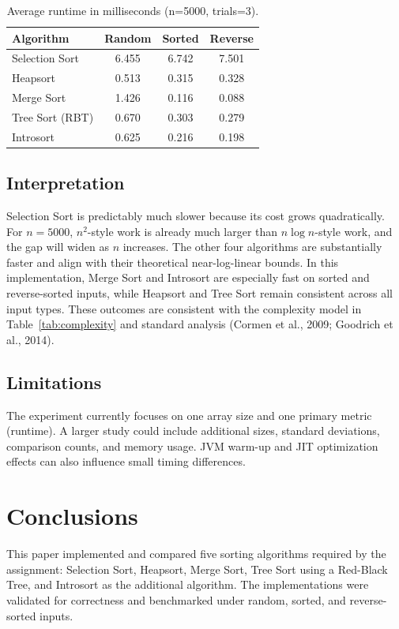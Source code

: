 \documentclass[12pt]{article}
\begin{document}
\begin{table}[H]
\centering
\caption{Average runtime in milliseconds (n=5000, trials=3).}
\label{tab:results}
\begin{tabular}{lccc}
\toprule
Algorithm & Random & Sorted & Reverse \\
\midrule
Selection Sort & 6.455 & 6.742 & 7.501 \\
Heapsort & 0.513 & 0.315 & 0.328 \\
Merge Sort & 1.426 & 0.116 & 0.088 \\
Tree Sort (RBT) & 0.670 & 0.303 & 0.279 \\
Introsort & 0.625 & 0.216 & 0.198 \\
\bottomrule
\end{tabular}
\end{table}

\subsection*{Interpretation}
Selection Sort is predictably much slower because its cost grows quadratically. For $n=5000$, $n^2$-style work is already much larger than $n \log n$-style work, and the gap will widen as $n$ increases. The other four algorithms are substantially faster and align with their theoretical near-log-linear bounds. In this implementation, Merge Sort and Introsort are especially fast on sorted and reverse-sorted inputs, while Heapsort and Tree Sort remain consistent across all input types. These outcomes are consistent with the complexity model in Table~\ref{tab:complexity} and standard analysis (Cormen et al., 2009; Goodrich et al., 2014).

\subsection*{Limitations}
The experiment currently focuses on one array size and one primary metric (runtime). A larger study could include additional sizes, standard deviations, comparison counts, and memory usage. JVM warm-up and JIT optimization effects can also influence small timing differences.

\section{Conclusions}
This paper implemented and compared five sorting algorithms required by the assignment: Selection Sort, Heapsort, Merge Sort, Tree Sort using a Red-Black Tree, and Introsort as the additional algorithm. The implementations were validated for correctness and benchmarked under random, sorted, and reverse-sorted inputs.
\end{document}
